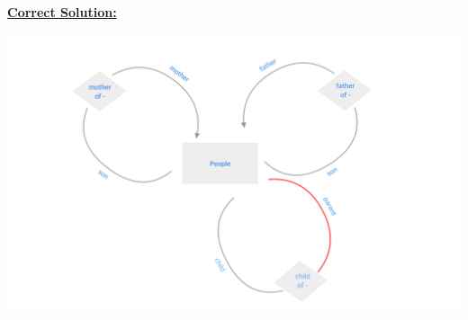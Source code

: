 \documentclass[12pt]{article}
\begin{document}
\begin{enumerate}[1.]
    \begin{mdframed}
        \underline{\textbf{Correct Solution:}}

        \bigskip

        \begin{center}
        \includegraphics[width=\linewidth]{images/worksheet_14_solution_29.png}
        \end{center}
    \end{mdframed}



\end{enumerate}
\end{document}
